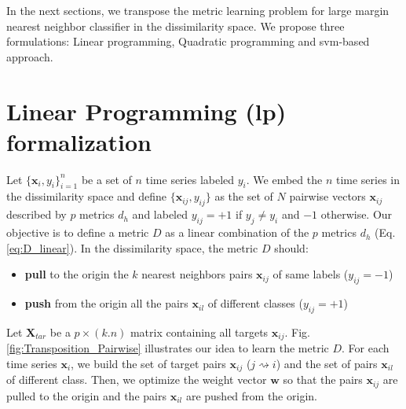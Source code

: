 In the next sections, we transpose the metric learning problem for large margin nearest neighbor classifier in the dissimilarity space. We propose three formulations: Linear programming, Quadratic programming and {\sc svm}-based approach.


\section{Linear Programming ({\sc lp}) formalization}

Let $\{\textbf{x}_{i}, y_{i}\}_{i=1}^n$ be a set of $n$ time series labeled $y_{i}$. We embed the $n$ time series in the dissimilarity space and define $\{\textbf{x}_{ij}, y_{ij}\}$ as the set of $N$ pairwise vectors $\textbf{x}_{ij}$ described by $p$ metrics $d_h$ and labeled $y_{ij}=+1$ if $y_{j} \neq y_{i}$ and $-1$ otherwise. Our objective is to define a metric $D$ as a linear combination of the $p$ metrics $d_h$ (Eq. \ref{eq:D_linear}). In the dissimilarity space, the metric $D$ should:
\begin{itemize}
	\item \textbf{pull} to the origin the $k$ nearest neighbors pairs $\textbf{x}_{ij}$ of same labels ($y_{ij} = -1$)
	\item \textbf{push} from the origin all the pairs $\textbf{x}_{il}$ of different classes ($y_{ij} = +1$)
\end{itemize}
Let $\textbf{X}_{tar}$ be a $p \times (k.n)$ matrix  containing all targets $\textbf{x}_{ij}$. Fig. \ref{fig:Transposition_Pairwise} illustrates our idea to learn the metric $D$. For each time series $\textbf{x}_i$, we build the set of target pairs $\textbf{x}_{ij}$ ($j \rightsquigarrow i$) and the set of pairs $\textbf{x}_{il}$ of different class. Then, we optimize the weight vector $\textbf{w}$ so that the pairs $\textbf{x}_{ij}$ are pulled to the origin and the pairs $\textbf{x}_{il}$ are pushed from the origin.

